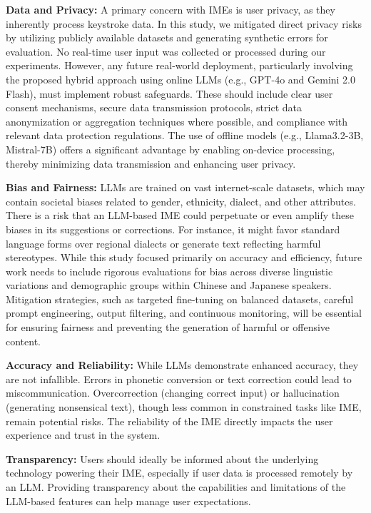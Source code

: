 \documentclass[10pt, a4paper]{article}
\begin{document}
\textbf{Data and Privacy:} A primary concern with IMEs is user privacy, as they inherently process keystroke data. In this study, we mitigated direct privacy risks by utilizing publicly available datasets  and generating synthetic errors for evaluation. No real-time user input was collected or processed during our experiments. However, any future real-world deployment, particularly involving the proposed hybrid approach using online LLMs (e.g., GPT-4o and Gemini 2.0 Flash), must implement robust safeguards. These should include clear user consent mechanisms, secure data transmission protocols, strict data anonymization or aggregation techniques where possible, and compliance with relevant data protection regulations. The use of offline models (e.g., Llama3.2-3B, Mistral-7B) offers a significant advantage by enabling on-device processing, thereby minimizing data transmission and enhancing user privacy.

\textbf{Bias and Fairness:} LLMs are trained on vast internet-scale datasets, which may contain societal biases related to gender, ethnicity, dialect, and other attributes. There is a risk that an LLM-based IME could perpetuate or even amplify these biases in its suggestions or corrections. For instance, it might favor standard language forms over regional dialects or generate text reflecting harmful stereotypes. While this study focused primarily on accuracy and efficiency, future work needs to include rigorous evaluations for bias across diverse linguistic variations and demographic groups within Chinese and Japanese speakers. Mitigation strategies, such as targeted fine-tuning on balanced datasets, careful prompt engineering, output filtering, and continuous monitoring, will be essential for ensuring fairness and preventing the generation of harmful or offensive content.

\textbf{Accuracy and Reliability:} While LLMs demonstrate enhanced accuracy, they are not infallible. Errors in phonetic conversion or text correction could lead to miscommunication. Overcorrection (changing correct input) or hallucination (generating nonsensical text), though less common in constrained tasks like IME, remain potential risks. The reliability of the IME directly impacts the user experience and trust in the system.

\textbf{Transparency:} Users should ideally be informed about the underlying technology powering their IME, especially if user data is processed remotely by an LLM. Providing transparency about the capabilities and limitations of the LLM-based features can help manage user expectations.
\end{document}

